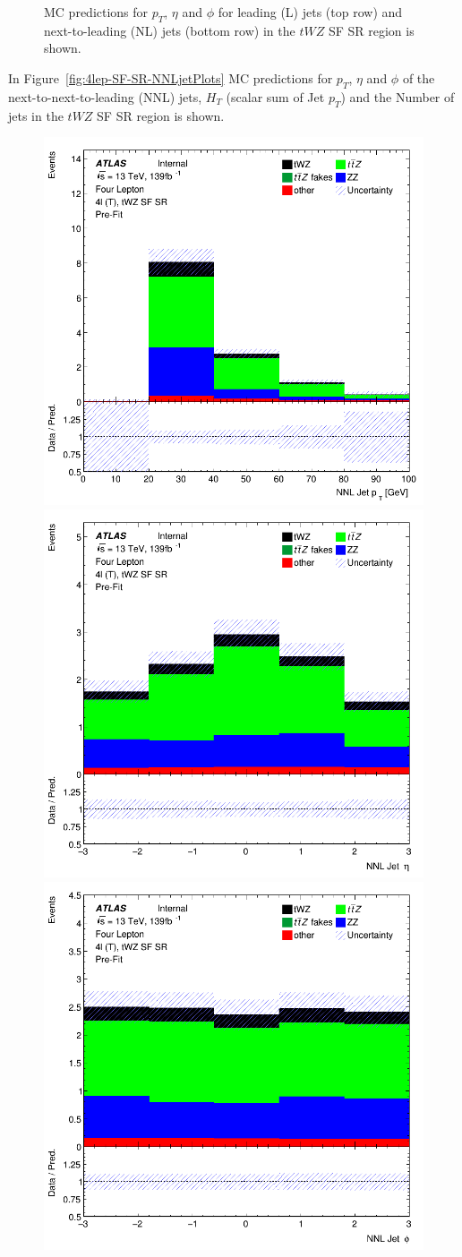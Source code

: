 \begin{figure}[htbp]
\begin{tabular}{ccc}
  \end{tabular}
    \caption{MC predictions for $p_{T}$, $\eta$ and $\phi$ for leading (L) jets (top row) and next-to-leading (NL) jets (bottom row) in the $tWZ$ SF SR region  is shown.}
    \label{fig:4lep-SF-SR-LandNjetPlots} 
\end{figure}

In Figure~\ref{fig:4lep-SF-SR-NNLjetPlots} MC predictions for $p_{T}$, $\eta$ and $\phi$ of the next-to-next-to-leading (NNL) jets, $H_{T}$ (scalar sum of Jet $p_{T}$) and the Number of jets in the $tWZ$ SF SR region is shown.


\begin{figure}[htbp]
 \centering


    \includegraphics[width=.3\textwidth]{figures/PreFitPlots/lep4_tWZ_4T_SF_NNLJet_pt.png} \quad
    \includegraphics[width=.3\textwidth]{figures/PreFitPlots/lep4_tWZ_4T_SF_NNLJet_eta.png} \quad
    \includegraphics[width=.3\textwidth]{figures/PreFitPlots/lep4_tWZ_4T_SF_NNLJet_phi.png}

    \medskip


\end{figure}
